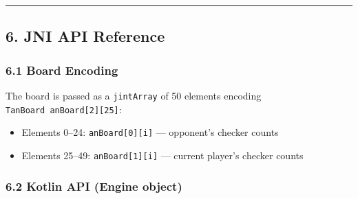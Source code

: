 \documentclass[11pt,a4paper]{article}
\providecommand{\tightlist}{\setlength{\itemsep}{2pt}\setlength{\parskip}{0pt}}
\begin{document}
\begin{center}\rule{0.5\linewidth}{0.5pt}\end{center}

\subsection{6. JNI API Reference}\label{jni-api-reference}

\subsubsection{6.1 Board Encoding}\label{board-encoding}

The board is passed as a \texttt{jintArray} of 50 elements encoding
\texttt{TanBoard\ anBoard{[}2{]}{[}25{]}}:

\begin{itemize}
\tightlist
\item
  Elements 0--24: \texttt{anBoard{[}0{]}{[}i{]}} --- opponent's checker
  counts
\item
  Elements 25--49: \texttt{anBoard{[}1{]}{[}i{]}} --- current player's
  checker counts
\end{itemize}

\subsubsection{6.2 Kotlin API (Engine
object)}\label{kotlin-api-engine-object}
\end{document}
